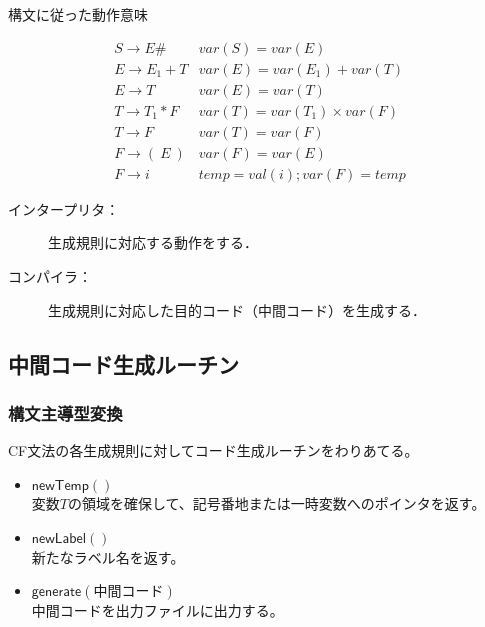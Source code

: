 \documentclass[dvipdfmx]{beamer}
\begin{document}
\begin{frame}{構文に従った動作意味}

  \[
    \begin{array}{ll}
      S\rightarrow E\#       & var(S)= var(E)               \\
      E\rightarrow E_1+T     & var(E)= var(E_1)+var(T)      \\
      E\rightarrow T         & var(E)=var(T)                \\
      T\rightarrow T_1\ast F & var(T)=var(T_1)\times var(F) \\
      T\rightarrow F         & var(T)=var(F)                \\
      F\rightarrow (\ E\ )   & var(F)=var(E)                \\
      F\rightarrow i         & temp=val(i);var(F)=temp
    \end{array}
  \]

  \vspace*{3mm}


  \begin{description}
    \item [インタープリタ：] 生成規則に対応する動作をする．
    \item [コンパイラ：] 生成規則に対応した目的コード（中間コード）を生成する．
  \end{description}
\end{frame}

\subsection{中間コード生成ルーチン}


\begin{frame}
  \frametitle{構文主導型変換}
  CF文法の各生成規則に対してコード生成ルーチンをわりあてる。\\
  \begin{itemize}
    \item $\mathsf{newTemp}()$\\
          変数$T$の領域を確保して、記号番地または一時変数へのポインタを返す。
    \item $\mathsf{newLabel}()$\\
          新たなラベル名を返す。
    \item $\mathsf{generate}(\mbox{中間コード})$\\
          中間コードを出力ファイルに出力する。
  \end{itemize}



\end{frame}
\end{document}
